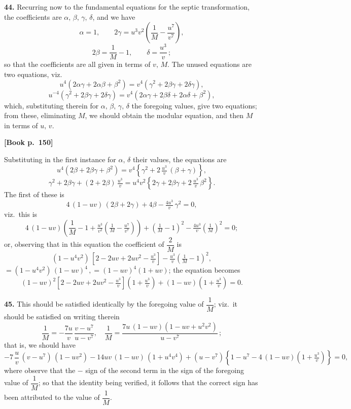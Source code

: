 \documentclass[11pt]{article}
\begin{document}
\medskip

\textbf{44.} Recurring now to the fundamental equations for the septic transformation,
the coefficients are $\alpha,\,\beta,\,\gamma,\,\delta$, and we have
\[
\alpha = 1,\qquad 2\gamma = u^3 v^2\!\left(\frac{1}{M}-\frac{u^7}{v^7}\right),
\]
\[
2\beta = \frac{1}{M} - 1,\qquad \delta = \frac{u^3}{v}\,;
\]
so that the coefficients are all given in terms of $v,\,M$. The unused equations are
two equations, viz.
\[
u^4(2\alpha\gamma + 2\alpha\beta + \beta^2) = v^4(\gamma^2 + 2\beta\gamma + 2\delta\gamma),
\]
\[
u^{-4}(\gamma^2 + 2\beta\gamma + 2\delta\gamma) = v^4(2\alpha\gamma + 2\beta\delta + 2\alpha\delta + \beta^2),
\]
which, substituting therein for $\alpha,\,\beta,\,\gamma,\,\delta$ the foregoing values, give
two equations; from these, eliminating $M$, we should obtain the modular equation,
and then $M$ in terms of $u,\,v$.

\bigskip

\noindent\textbf{[Book p.~150]}

\medskip

Substituting in the first instance for $\alpha,\,\delta$ their values, the equations are
\[
u^4(2\beta + 2\beta\gamma + \beta^2) = v^4\!\left\{\gamma^2 + 2\,\tfrac{u^3}{v}\,(\beta + \gamma)\right\},
\]
\[
\gamma^2 + 2\beta\gamma + (2+2\beta)\,\tfrac{u^3}{v} = u^4 v^2\!\left\{2\gamma + 2\beta\gamma + 2\,\tfrac{u^3}{v}\,\beta^2\right\}.
\]
The first of these is
\[
4\,(1 - uv)\,(2\beta + 2\gamma) + 4\beta - \tfrac{4u^3}{v}\,\gamma^2 = 0,
\]
viz.\ this is
\[
4\,(1 - uv)\!\left(\frac{1}{M} - 1 + \tfrac{u^3}{v^2}\!\left(\tfrac{1}{M} - \tfrac{u^7}{v^7}\right)\right) + \!\left(\tfrac{1}{M}-1\right)^{\!2} - \tfrac{4 u^3}{v}\!\left(\tfrac{1}{M}\right)^{\!2}= 0;
\]
or, observing that in this equation the coefficient of $\dfrac{2}{M}$ is
\[
(1 - u^4 v^2)\,[2 - 2uv + 2u v^2 - \tfrac{u^3}{v}] - \tfrac{u^3}{v}\!\left(\tfrac{1}{M} - 1\right)^{\!2},
\]
$= (1 - u^4 v^2)\,(1 - uv)^4\,,= (1 - uv)^4(1+uv)$;
the equation becomes
\[
(1 - uv)^2\!\left[2 - 2uv + 2u v^2 - \tfrac{u^3}{v}\right]\!\left(1 + \tfrac{u^3}{v}\right) + (1 - uv)\!\left(1 + \tfrac{u^3}{v}\right) = 0.
\]

\medskip

\textbf{45.} This should be satisfied identically by the foregoing value of $\dfrac{1}{M}$;
viz.\ it should be satisfied on writing therein
\[
\frac{1}{M} = -\frac{7u}{v}\,\frac{v - u^7}{u - v^7},\quad \frac{1}{M} = \frac{7u\,(1 - uv)(1 - uv + u^2 v^2)}{u - v^7}\,;
\]
that is, we should have
\[
-7\,\frac{u}{v}\,(v - u^7)\,(1 - u v^2) - 14uv\,(1 - uv)\,(1 + u^4 v^4)
+ (u - v^7)\!\left\{1 - u^7 - 4\,(1 - uv)\!\left(1 + \tfrac{u^3}{v}\right)\right\} = 0,
\]
where observe that the $-$ sign of the second term in the sign of the foregoing value
of $\dfrac{1}{M}$; so that the identity being verified, it follows that the correct sign has been
attributed to the value of $\dfrac{1}{M}$.
\end{document}
